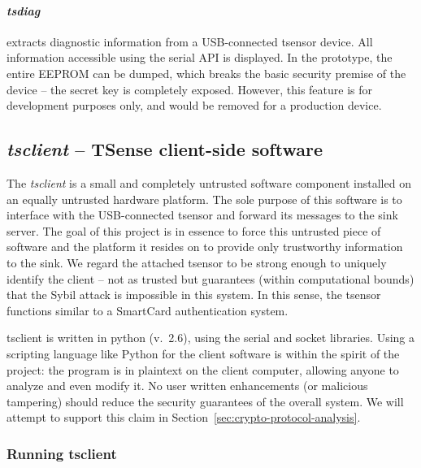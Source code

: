 \paragraph{\textit{tsdiag}} extracts diagnostic information from a USB-connected tsensor device. All information accessible using the serial API is displayed. In the prototype, the entire EEPROM can be dumped, which breaks the basic security premise of the device -- the secret key is completely exposed. However, this feature is for development purposes only, and would be removed for a production device.

\subsection{\textit{tsclient} -- TSense client-side software}

The \textit{tsclient} is a small and completely untrusted software component installed on an equally untrusted hardware platform. The sole purpose of this software is to interface with the USB-connected tsensor and forward its messages to the sink server. The goal of this project is in essence to force this untrusted piece of software and the platform it resides on to provide only trustworthy information to the sink. 
%
We regard the attached tsensor to be strong enough to uniquely identify the client -- not as trusted but guarantees (within computational bounds) that the Sybil attack  is impossible in this system. In this sense, the tsensor functions similar to a SmartCard authentication system.

tsclient is written in python (v.\ 2.6), using the serial and socket libraries. Using a scripting language like Python for the client software is within the spirit of the project: the program is in plaintext on the client computer, allowing anyone to analyze and even modify it. No user written enhancements (or malicious tampering) should reduce the security guarantees of the overall system. We will attempt to support this claim in Section~\ref{sec:crypto-protocol-analysis}.

\subsubsection{Running tsclient}

